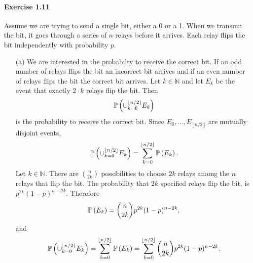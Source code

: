 \paragraph{Exercise 1.11} Assume we are trying to send a single bit, either a 0
 or a 1. When we transmit the bit, it goes through a series of $n$ relays
 before it arrives. Each relay flips the bit independently with probability $p$.
 \begin{enumerate}
   \item[(a)] We are interested in the probabilty to receive the correct bit.
    If an odd number of relays flips the bit an incorrect bit arrives and if
    an even number of relays flips the bit the correct bit arrives. Let $k \in
    \mathbb{N}$ and let $E_k$ be the event that exactly $2 \cdot k$ relays flip
    the bit. Then
    \[ \mathbb{P}\left(\cup_{k=0}^{\left\lfloor n/2 \right\rfloor} E_k \right) \]
    is the probability to receive the correct bit.
    Since $E_0,...,E_{\left\lfloor n/2 \right\rfloor}$ are mutually
    disjoint events,
    \[
      \mathbb{P}\left(\cup_{k=0}^{\left\lfloor n/2 \right\rfloor} E_k \right)
      = \sum_{k=0}^{\left\lfloor n/2 \right\rfloor} \mathbb{P}\left( E_k \right).
    \]
    Let $k \in \mathbb{N}$. There are $\binom{n}{2k}$ possibilities to choose $2k$
    relays among the $n$ relays that flip the bit. The probability that $2k$
    specified relays flip the bit, is $p^{2k}(1-p)^{n-2k}$. Therefore
    \[ \mathbb{P}\left(E_k\right) = \binom{n}{2k} p^{2k}(1-p)^{n-2k}, \]
    and
    \[
      \mathbb{P}\left(\cup_{k=0}^{\left\lfloor n/2 \right\rfloor} E_k \right)
      = \sum_{k=0}^{\left\lfloor n/2 \right\rfloor} \mathbb{P}\left( E_k \right)
      = \sum_{k=0}^{\left\lfloor n/2 \right\rfloor} \binom{n}{2k} p^{2k}(1-p)^{n-2k}.
    \]


\end{enumerate}
